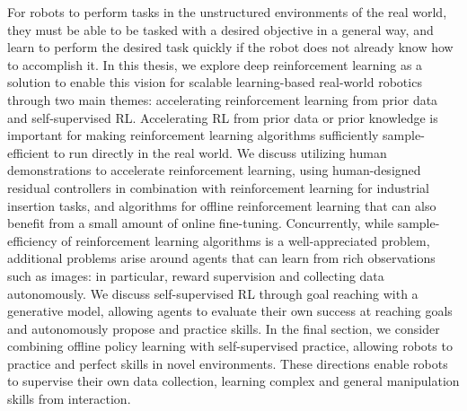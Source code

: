 For robots to perform tasks in the unstructured environments of the real world, they must be able to be tasked with a desired objective in a general way, and learn to perform the desired task quickly if the robot does not already know how to accomplish it. In this thesis, we explore deep reinforcement learning as a solution to enable this vision for scalable learning-based real-world robotics through two main themes: accelerating reinforcement learning from prior data and self-supervised RL. Accelerating RL from prior data or prior knowledge is important for making reinforcement learning algorithms sufficiently sample-efficient to run directly in the real world. We discuss utilizing human demonstrations to accelerate reinforcement learning, using human-designed residual controllers in combination with reinforcement learning for industrial insertion tasks, and algorithms for offline reinforcement learning that can also benefit from a small amount of online fine-tuning.
Concurrently, while sample-efficiency of reinforcement learning algorithms is a well-appreciated problem, additional problems arise around agents that can learn from rich observations such as images: in particular, reward supervision and collecting data autonomously. We discuss self-supervised RL through goal reaching with a generative model, allowing agents to evaluate their own success at reaching goals and autonomously propose and practice skills. In the final section, we consider combining offline policy learning with self-supervised practice, allowing robots to practice and perfect skills in novel environments. These directions enable robots to supervise their own data collection, learning complex and general manipulation skills from interaction.